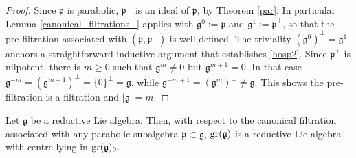 \documentclass[leqno,12pt]{amsart} %
\begin{document}
\begin{proof}
  Since ${\mathfrak p} $ is parabolic, ${\mathfrak p}^\perp $ is an ideal of
  ${\mathfrak p} $, by Theorem \ref{par}. In particular Lemma \ref{canonical_filtrations_}
  applies with ${\mathfrak g}^0:={\mathfrak p} $ and
  ${\mathfrak g}^1:={\mathfrak p}^\perp$, so that the pre-filtration associated with
  $({\mathfrak p}, {\mathfrak p}^\perp)$ is well-defined.  The triviality
  $({\mathfrak g}^0)^\perp={\mathfrak g}^1$ anchors a straightforward inductive argument
  that establishes \eqref{hosp2}. Since ${\mathfrak p}^\perp $ is nilpotent, there is
  $m \ge 0$ such that ${\mathfrak g}^m\ne 0$ but ${\mathfrak g}^{m+1} = 0$. In that case
  ${\mathfrak g}^{-m} = ({\mathfrak g}^{m+1})^\perp = \{0\}^\perp = {\mathfrak g} $, while
  ${\mathfrak g}^{-m+1}=({\mathfrak g}^m)^\perp \ne {\mathfrak g}$. This shows the
  pre-filtration is a filtration and $|{\mathfrak g}|=m$.
\end{proof}

\begin{theorem}
  Let ${\mathfrak g} $ be a reductive Lie algebra. Then, with respect to the canonical
  filtration associated with any parabolic subalgebra
  ${\mathfrak p} \subset {\mathfrak g}$, $\operatorname{\operatorname{gr}}({\mathfrak g})$ is a reductive Lie
  algebra with centre lying in $\operatorname{\operatorname{gr}}({\mathfrak g})_0$.
\end{theorem}
\end{document}
